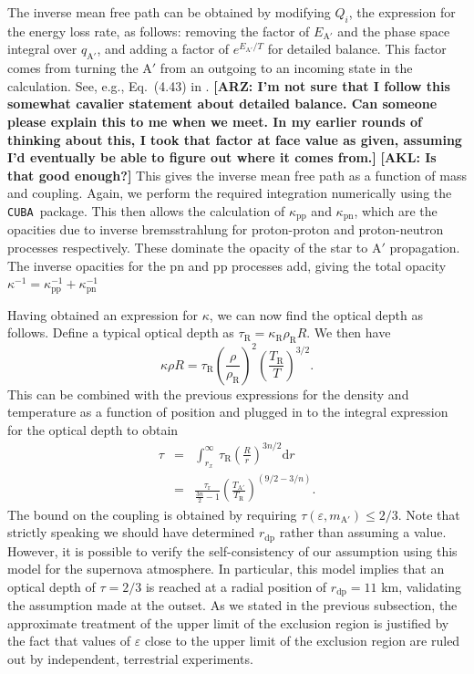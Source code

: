 \documentclass[nofootinbib,prd,superscriptaddress,twocolumn]{revtex4}
\newcommand{\beq}{\begin{equation}}
\newcommand{\eeq}{\end{equation}}
\newcommand{\bea}{\begin{eqnarray}}
\newcommand{\eea}{\end{eqnarray}}
\newcommand{\qa}{q_{\mathrm{A}'}}
\newcommand{\dd}{\mathrm{d}}
\newcommand{\arz}[1]{{{\bf{\color{BrickRed}[ARZ: #1]}}}}
\newcommand{\akl}[1]{{{\bf{\color{Blue}[AKL: #1]}}}}
\begin{document}
The inverse mean free path can be obtained by modifying $ Q_i $, 
the expression for the energy loss rate, as follows: removing the factor of $ E_\mathrm{A'} $ 
and the phase space integral over $ \qa $, and adding a factor of $ e^{E_\mathrm{A'}/T} $ for detailed balance. This factor comes from turning the $\mathrm{A'}$ from an outgoing to an incoming state in the calculation.  See, e.g., Eq.~(4.43) in \cite{raffelt96_book}.
\arz{I'm not sure that I follow this somewhat cavalier statement about detailed balance. Can someone 
please explain this to me when we meet. In my earlier rounds of thinking about this, I took that factor 
at face value as given, assuming I'd eventually be able to figure out where it comes from.} \akl{Is that good enough?}
This gives the inverse mean free path as a function of mass and coupling. 
Again, we perform the required integration numerically using the {\tt CUBA }package. 
This then allows the calculation of $\kappa_{\mathrm{pp}}$ and $\kappa_{\mathrm{pn}}$, 
which are the opacities due to inverse bremsstrahlung for proton-proton and proton-neutron 
processes respectively. These dominate the opacity of the star to $\mathrm{A'}$ propagation. 
The inverse opacities for the $\mathrm{pn}$ and $\mathrm{pp}$ processes add, 
giving the total opacity $ \kappa^{-1} = \kappa_{\mathrm{pp}}^{-1} + \kappa_{\mathrm{pn}}^{-1} $


Having obtained an expression for $ \kappa $, we can now find the optical depth as follows. 
Define a typical optical depth as $\tau_\mathrm{R} = \kappa_\mathrm{R} \rho_\mathrm{R} R $. We then have 
\beq 
\kappa \rho R = \tau_\mathrm{R} \left( \frac{\rho}{\rho_\mathrm{R}} \right)^2 \left( \frac{T_\mathrm{R}}{T} \right)^{3/2}.
\eeq
%
This can be combined with the previous expressions for the density and temperature as a function of position 
and plugged in to the integral expression for the optical depth to obtain 
\bea 
\tau &=& \int_{r_x}^{\infty}\, \tau_\mathrm{R} \left( \frac{R}{r} \right)^{3n/2} \dd r \\
 &=& \frac{\tau_\mathrm{r}}{\frac{3n}{2}-1} \left( \frac{T_\mathrm{A'}}{T_\mathrm{R}} \right)^{(9/2-3/n)}. 
 \eea
 The bound on the coupling is obtained by requiring  $ \tau(\varepsilon,m_\mathrm{A'}) \le 2/3 $. Note that strictly speaking we should have determined $ r_{\mathrm{dp}}$ rather than assuming a value. However, it is possible to verify the self-consistency of our assumption using this model for the supernova atmosphere. In particular, this model implies that an optical depth of $\tau=2/3$ is reached at a radial position of $ r_{\mathrm{dp}}= 11$ km,  validating the assumption made at the outset. As we stated in the previous subsection, the approximate treatment of the upper limit of the exclusion region is justified by the fact that values of $\varepsilon$ close to the upper limit of the exclusion region are ruled out by independent, terrestrial experiments.
\end{document}
